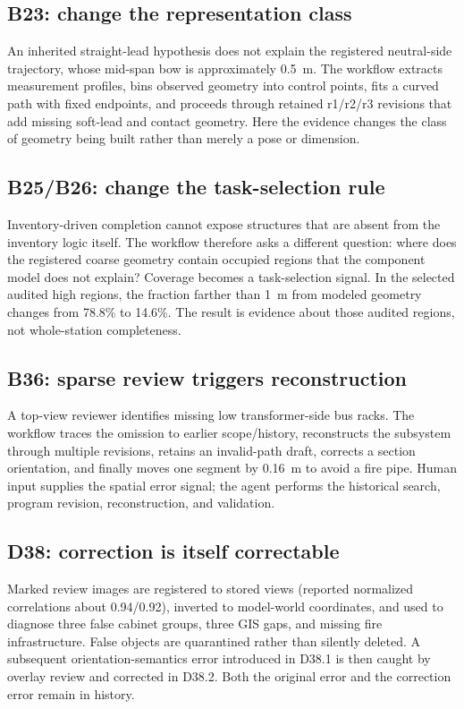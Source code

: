 \documentclass[10pt]{article}
\begin{document}
\subsection{B23: change the representation class}
An inherited straight-lead hypothesis does not explain the registered neutral-side trajectory, whose mid-span bow is approximately 0.5~m. The workflow extracts measurement profiles, bins observed geometry into control points, fits a curved path with fixed endpoints, and proceeds through retained r1/r2/r3 revisions that add missing soft-lead and contact geometry. Here the evidence changes the class of geometry being built rather than merely a pose or dimension.

\subsection{B25/B26: change the task-selection rule}
Inventory-driven completion cannot expose structures that are absent from the inventory logic itself. The workflow therefore asks a different question: where does the registered coarse geometry contain occupied regions that the component model does not explain? Coverage becomes a task-selection signal. In the selected audited high regions, the fraction farther than 1~m from modeled geometry changes from 78.8\% to 14.6\%. The result is evidence about those audited regions, not whole-station completeness.

\subsection{B36: sparse review triggers reconstruction}
A top-view reviewer identifies missing low transformer-side bus racks. The workflow traces the omission to earlier scope/history, reconstructs the subsystem through multiple revisions, retains an invalid-path draft, corrects a section orientation, and finally moves one segment by 0.16~m to avoid a fire pipe. Human input supplies the spatial error signal; the agent performs the historical search, program revision, reconstruction, and validation.

\subsection{D38: correction is itself correctable}
Marked review images are registered to stored views (reported normalized correlations about 0.94/0.92), inverted to model-world coordinates, and used to diagnose three false cabinet groups, three GIS gaps, and missing fire infrastructure. False objects are quarantined rather than silently deleted. A subsequent orientation-semantics error introduced in D38.1 is then caught by overlay review and corrected in D38.2. Both the original error and the correction error remain in history.
\end{document}
